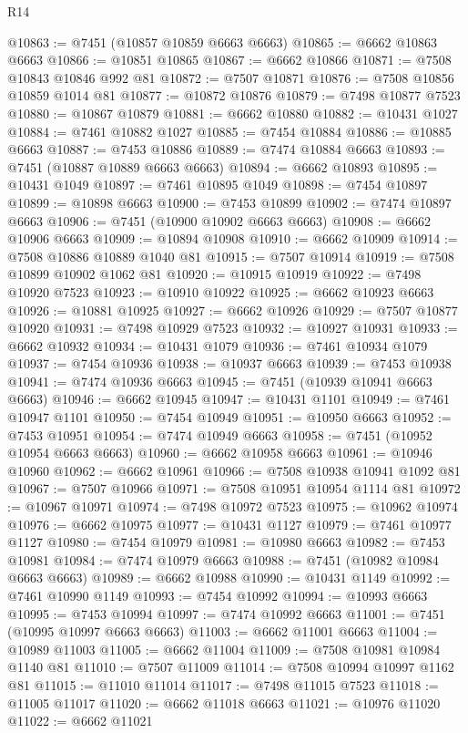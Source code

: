 \begin{lexlean}{R14}
\begin{coremodule}
{{{{{{{{{{{{{{{{{{{{{{{{{{{{{{{{{{{{{{{{{{{{{{{{{{{{{{{{{{{{{{{{{{{{{{{{{{{{{{{{{{@10863 := @7451 (@10857 @10859 @6663 @6663)
@10865 := @6662 @10863 @6663
@10866 := @10851 @10865
@10867 := @6662 @10866
@10871 := @7508 @10843 @10846 @992 @81
@10872 := @7507 @10871
@10876 := @7508 @10856 @10859 @1014 @81
@10877 := @10872 @10876
@10879 := @7498 @10877 @7523
@10880 := @10867 @10879
@10881 := @6662 @10880
@10882 := @10431 @1027
@10884 := @7461 @10882 @1027
@10885 := @7454 @10884
@10886 := @10885 @6663
@10887 := @7453 @10886
@10889 := @7474 @10884 @6663
@10893 := @7451 (@10887 @10889 @6663 @6663)
@10894 := @6662 @10893
@10895 := @10431 @1049
@10897 := @7461 @10895 @1049
@10898 := @7454 @10897
@10899 := @10898 @6663
@10900 := @7453 @10899
@10902 := @7474 @10897 @6663
@10906 := @7451 (@10900 @10902 @6663 @6663)
@10908 := @6662 @10906 @6663
@10909 := @10894 @10908
@10910 := @6662 @10909
@10914 := @7508 @10886 @10889 @1040 @81
@10915 := @7507 @10914
@10919 := @7508 @10899 @10902 @1062 @81
@10920 := @10915 @10919
@10922 := @7498 @10920 @7523
@10923 := @10910 @10922
@10925 := @6662 @10923 @6663
@10926 := @10881 @10925
@10927 := @6662 @10926
@10929 := @7507 @10877 @10920
@10931 := @7498 @10929 @7523
@10932 := @10927 @10931
@10933 := @6662 @10932
@10934 := @10431 @1079
@10936 := @7461 @10934 @1079
@10937 := @7454 @10936
@10938 := @10937 @6663
@10939 := @7453 @10938
@10941 := @7474 @10936 @6663
@10945 := @7451 (@10939 @10941 @6663 @6663)
@10946 := @6662 @10945
@10947 := @10431 @1101
@10949 := @7461 @10947 @1101
@10950 := @7454 @10949
@10951 := @10950 @6663
@10952 := @7453 @10951
@10954 := @7474 @10949 @6663
@10958 := @7451 (@10952 @10954 @6663 @6663)
@10960 := @6662 @10958 @6663
@10961 := @10946 @10960
@10962 := @6662 @10961
@10966 := @7508 @10938 @10941 @1092 @81
@10967 := @7507 @10966
@10971 := @7508 @10951 @10954 @1114 @81
@10972 := @10967 @10971
@10974 := @7498 @10972 @7523
@10975 := @10962 @10974
@10976 := @6662 @10975
@10977 := @10431 @1127
@10979 := @7461 @10977 @1127
@10980 := @7454 @10979
@10981 := @10980 @6663
@10982 := @7453 @10981
@10984 := @7474 @10979 @6663
@10988 := @7451 (@10982 @10984 @6663 @6663)
@10989 := @6662 @10988
@10990 := @10431 @1149
@10992 := @7461 @10990 @1149
@10993 := @7454 @10992
@10994 := @10993 @6663
@10995 := @7453 @10994
@10997 := @7474 @10992 @6663
@11001 := @7451 (@10995 @10997 @6663 @6663)
@11003 := @6662 @11001 @6663
@11004 := @10989 @11003
@11005 := @6662 @11004
@11009 := @7508 @10981 @10984 @1140 @81
@11010 := @7507 @11009
@11014 := @7508 @10994 @10997 @1162 @81
@11015 := @11010 @11014
@11017 := @7498 @11015 @7523
@11018 := @11005 @11017
@11020 := @6662 @11018 @6663
@11021 := @10976 @11020
@11022 := @6662 @11021
}}}}}}}}}}}}}}}}}}}}}}}}}}}}}}}}}}}}}}}}}}}}}}}}}}}}}}}}}}}}}}}}}}}}}}}}}}}}}}}}}}
\end{coremodule}
\end{lexlean}
